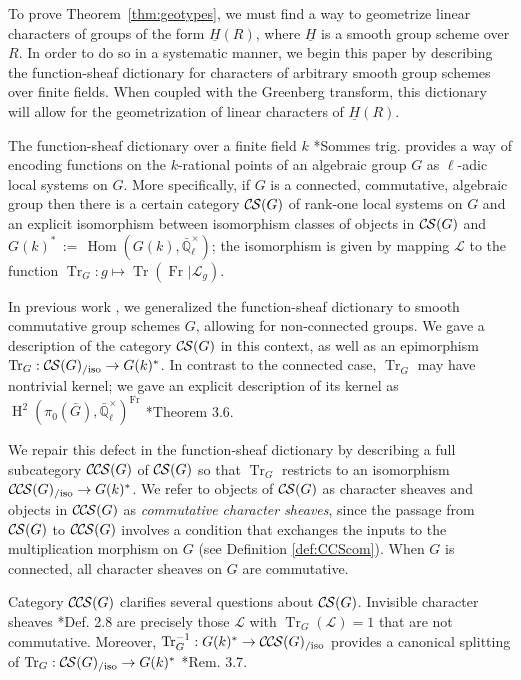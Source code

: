 \documentclass[10pt]{amsart}
\theoremstyle{plain}
\theoremstyle{definition}
\newcommand{\EE}{\mathbb{\bar Q}_\ell}
\newcommand{\EEx}{\EE^\times}
\newcommand{\Frob}[1]{\operatorname{Fr}_{#1}}
\DeclareMathOperator{\Hom}{Hom}
\DeclareMathOperator{\Hh}{H}
\newcommand{\ceq}{{\, :=\, }}
\DeclareMathOperator{\Tr}{Tr}
\newcommand{\TrFrob}[1]{\Tr_{#1}}
\newcommand{\cs}[1]{{\mathcal{#1}}}
\newcommand{\CS}{{\mathcal{C\hskip-0.8pt S}}}
\newcommand{\CCS}{{\mathcal{C\hskip-.8pt C\hskip-0.8pt S}}}
\newcommand{\CSiso}[1]{\CS(#1)_{/\text{iso}}}
\newcommand{\CCSiso}[1]{\CCS(#1)_{/\text{iso}}}
\newcommand{\bG}{\bar{G}}
\begin{document}
To prove Theorem~\ref{thm:geotypes}, we must find a way to geometrize linear characters of groups of the form $\underline{H}(R)$, where $\underline{H}$ is a smooth group scheme over $R$. 
In order to do so in a systematic manner, we begin this paper by describing the function-sheaf dictionary for characters of arbitrary smooth group schemes over finite fields. 
When coupled with the Greenberg transform, this dictionary will allow for the geometrization of linear characters of $\underline{H}(R)$.

The function-sheaf dictionary over a finite field $k$ \cite{deligne:SGA4.5}*{Sommes trig.}
provides a way of encoding functions on the $k$-rational points of an algebraic group $G$
as $\ell$-adic local systems on $G$.  More specifically, if $G$ is a connected, commutative, algebraic group
then there is a certain category $\CS(G)$ of rank-one local systems on $G$ and an
explicit isomorphism between isomorphism classes
of objects in $\CS(G)$ and $G(k)^* \ceq \Hom(G(k), \EEx)$; 
the isomorphism is given by mapping $\cs{L}$ to the function
$\TrFrob{G} : g \mapsto \Tr(\Frob{} \vert \cs{L}_g)$.

In previous work \cite{cunningham-roe:13a}, we generalized the function-sheaf dictionary to
smooth commutative group schemes $G$, allowing for non-connected groups.
We gave a description of the category $\CS(G)$ in this context, as well
as an epimorphism $\TrFrob{G} : \CSiso{G} \to G(k)^*$.
In contrast to the connected case, $\TrFrob{G}$ may have nontrivial kernel;
we gave an explicit description of its kernel as $\Hh^2(\pi_0(\bG), \EEx)^{\Frob{}}$ \cite{cunningham-roe:13a}*{Theorem 3.6}.  

We repair this defect in the function-sheaf dictionary
 by describing a full subcategory $\CCS(G)$ of $\CS(G)$ so that $\TrFrob{G}$ restricts to an isomorphism $\CCSiso{G} \to G(k)^*$.
We refer to objects of $\CS(G)$ as character sheaves and objects in $\CCS(G)$ as \emph{commutative character sheaves}, since the passage from $\CS(G)$ to $\CCS(G)$ involves a condition that exchanges the inputs to the multiplication morphism on $G$ (see Definition \ref{def:CCScom}).  
When $G$ is connected, all character sheaves on $G$ are commutative.

Category $\CCS(G)$ clarifies several questions about $\CS(G)$. 
Invisible character sheaves \cite{cunningham-roe:13a}*{Def. 2.8} are precisely those $\cs{L}$ with $\TrFrob{G}(\cs{L}) = 1$ that are not commutative.  Moreover, $\TrFrob{G}^{-1} : G(k)^* \to \CCSiso{G}$ provides a canonical splitting of $\TrFrob{G} : \CSiso{G} \to G(k)^*$ \cite{cunningham-roe:13a}*{Rem. 3.7}.
\end{document}
